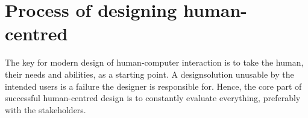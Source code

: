\chapter{Process of designing human-centred} \label{chap:process}
The key for modern design of human-computer interaction is to take the human, their needs and abilities, as a starting point. A designsolution unusable by the intended users is a failure the designer is responsible for. Hence, the core part of successful human-centred design is to constantly evaluate everything, preferably with the stakeholders.




